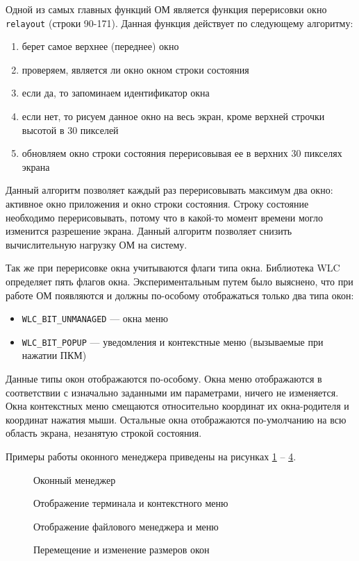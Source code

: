 Одной из самых главных функций ОМ является функция перерисовки окно \texttt{relayout} (строки 90-171). Данная функция действует по следующему алгоритму:
\begin{enumerate}
\item берет самое верхнее (переднее) окно
\item проверяем, является ли окно окном строки состояния
\item если да, то запоминаем идентификатор окна
\item если нет, то рисуем данное окно на весь экран, кроме верхней строчки высотой в 30 пикселей
\item обновляем окно строки состояния перерисовывая ее в верхних 30 пикселях экрана 
\end{enumerate}

Данный алгоритм позволяет каждый раз перерисовывать максимум два окно: активное окно приложения и окно строки состояния. Строку состояние необходимо перерисовывать, потому что в какой-то момент времени могло изменится разрешение экрана. Данный алгоритм позволяет снизить вычислительную нагрузку ОМ на систему. 

Так же при перерисовке окна учитываются флаги типа окна. Библиотека WLC определяет пять флагов окна. Экспериментальным путем было выяснено, что при работе ОМ появляются и должны по-особому отображаться только два типа окон:
\begin{itemize}
\item \texttt{WLC\_BIT\_UNMANAGED} --- окна меню
\item \texttt{WLC\_BIT\_POPUP} --- уведомления и контекстные меню (вызываемые при нажатии ПКМ)
\end{itemize}

Данные типы окон отображаются по-особому. Окна меню отображаются в соответствии с изначально заданными им параметрами, ничего не изменяется. Окна контекстных меню смещаются относительно координат их окна-родителя и координат нажатия мыши. Остальные окна отображаются по-умолчанию на всю область экрана, незанятую строкой состояния.

Примеры работы оконного менеджера приведены на рисунках \ref{fig:wm1} -- \ref{fig:wm4}.
\begin{figure}[h!]
\center{\texttt{[image: wm1]}}
\caption{Оконный менеджер}
\label{fig:wm1}
\end{figure}
\begin{figure}[h!]
\center{\texttt{[image: wm2]}}
\caption{Отображение терминала и контекстного меню}
\label{fig:wm2}
\end{figure}
\begin{figure}[h!]
\center{\texttt{[image: wm3]}}
\caption{Отображение файлового менеджера и меню}
\label{fig:wm3}
\end{figure}
\begin{figure}[h!]
\center{\texttt{[image: wm4]}}
\caption{Перемещение и изменение размеров окон}
\label{fig:wm4}
\end{figure}


